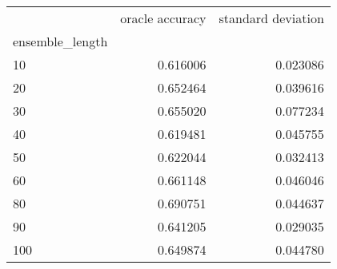 \begin{tabular}{lrr}
\toprule
{} &  oracle accuracy &  standard deviation \\
ensemble\_length &                  &                     \\
\midrule
10              &         0.616006 &            0.023086 \\
20              &         0.652464 &            0.039616 \\
30              &         0.655020 &            0.077234 \\
40              &         0.619481 &            0.045755 \\
50              &         0.622044 &            0.032413 \\
60              &         0.661148 &            0.046046 \\
80              &         0.690751 &            0.044637 \\
90              &         0.641205 &            0.029035 \\
100             &         0.649874 &            0.044780 \\
\bottomrule
\end{tabular}
